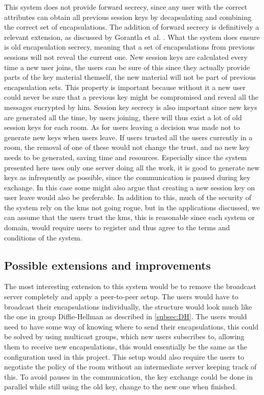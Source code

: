 This system does not provide forward secrecy, since any user with the correct attributes can obtain all previous session keys by decapsulating and combining the correct set of encapsulations. The addition of forward secrecy is definitively a relevant extension, as discussed by Gorantla et al. \cite{gorantla2010attribute}. What the system does ensure is old encapsulation secrecy, meaning that a set of encapsulations from previous sessions will not reveal the current one. New session keys are calculated every time a new user joins, the users can be sure of this since they actually provide parts of the key material themself, the new material will not be part of previous encapsulation sets. This property is important because without it a new user could never be sure that a previous key might be compromised and reveal all the messages encrypted by him. Session key secrecy is also important since new keys are generated all the time, by users joining, there will thus exist a lot of old session keys for each room. As for users leaving a decision was made not to generate new keys when users leave. If users trusted all the users currently in a room, the removal of one of these would not change the trust, and no new key needs to be generated, saving time and resources. Especially since the system presented here uses only one server doing all the work, it is good to generate new keys as infrequently as possible, since the communication is paused during key exchange. In this case some might also argue that creating a new session key on user leave would also be preferable. In addition to this, much of the security of the system rely on the \gls{kms} not going rogue, but in the applications discussed, we can assume that the users trust the \gls{kms}, this is reasonable since each system or domain, would require users to register and thus agree to the terms and conditions of the system.



\subsection{Possible extensions and improvements}
The most interesting extension to this system would be to remove the broadcast server completely and apply a peer-to-peer setup. The users would have to broadcast their encapsulations individually, the structure would look much like the one in group Diffie-Hellman as described in \ref{subsec:DH}. The users would need to have some way of knowing where to send their encapsulations, this could be solved by using multicast groups, which new users subscribes to, allowing them to receive new encapsulations, this would essentially be the same as the configuration used in this project. This setup would also require the users to negotiate the policy of the room without an intermediate server keeping track of this. To avoid pauses in the communication, the key exchange could be done in parallel while still using the old key, change to the new one when finished. 

